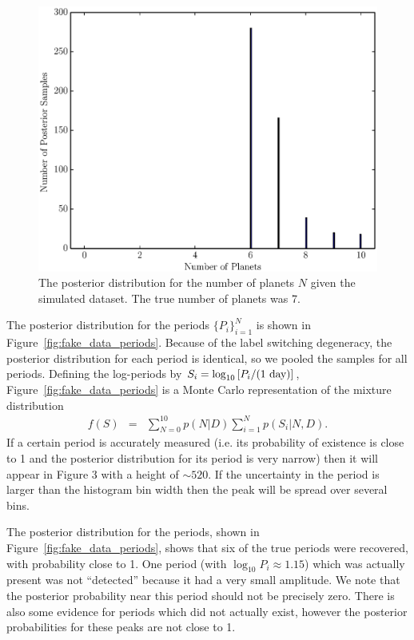 \documentclass[useAMS,usenatbib]{mn2e}
\begin{document}
\begin{figure}
\includegraphics[scale=0.4]{Figures/fake_data_N.eps}
\caption{The posterior distribution for the number of planets $N$ given the
simulated dataset. The true number of planets was 7.
\label{fig:fake_data_N}}
\end{figure}

The posterior distribution for the periods $\{P_i\}_{i=1}^N$ is shown in
Figure~\ref{fig:fake_data_periods}. Because of the label switching degeneracy,
the posterior distribution for each period is identical, so we pooled the
samples for all periods. Defining the log-periods by
$S_i =  \log_{10}\left[P_i/(\textnormal{1 day})\right]$,
Figure~\ref{fig:fake_data_periods} is a Monte Carlo representation
of the mixture distribution
\begin{eqnarray}
f(S) &=& \sum_{N=0}^{10} p(N | D)\sum_{i=1}^N p(S_i | N, D).
\end{eqnarray}
If a certain period is accurately measured (i.e. its probability of existence
is close to 1 and the posterior distribution for its period is very narrow)
then it will appear in Figure 3 with a height of $\sim 520$. If the uncertainty
in the period is larger than the histogram bin width then the peak will be
spread over several bins.

The posterior distribution for the periods, shown in
Figure~\ref{fig:fake_data_periods}, shows that six of the true periods were
recovered, with probability close to 1. One period (with $\log_{10}P_i \approx 1.15$)
which was actually present was not ``detected'' because it had a very small
amplitude. We note that the posterior probability near this period should not be
precisely zero. There is also some
evidence for periods which did not actually exist, however the posterior
probabilities for these peaks are not close to 1.
\end{document}
